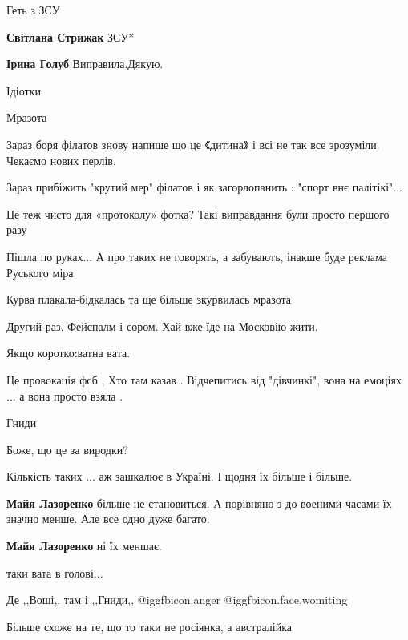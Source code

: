 \begin{itemize}
Геть з ЗСУ

\begin{itemize} %
\textbf{Світлана Стрижак} ЗСУ*

\textbf{Ірина Голуб} Виправила.Дякую.
\end{itemize} %

Ідіотки

Мразота

Зараз боря філатов знову напише що це 《дитина》 і всі не так все зрозуміли. Чекаємо нових перлів.

Зараз прибіжить "крутий мер" філатов і як загорлопанить : "спорт внє палітікі"...

Це теж чисто для «протоколу» фотка? Такі виправдання були просто першого разу

Пішла по руках... А про таких не говорять, а забувають, інакше буде реклама Руського міра

Курва плакала-бідкалась та ще більше зкурвилась мразота

Другий раз. Фейспалм і сором. Хай вже їде на Московію жити.

Якщо коротко:ватна вата.

Це провокація фсб , Хто там казав . Відчепитись від "дівчинкі", вона на емоціях ... а вона просто взяла .

Гниди

Боже, що це за виродки?

Кількість таких ... аж зашкалює в Україні. І щодня їх більше і більше.

\begin{itemize} %
\textbf{Майя Лазоренко} більше не становиться. А порівняно з до военими часами їх значно менше. Але все одно дуже багато.

\textbf{Майя Лазоренко} ні їх меншає.
\end{itemize} %

таки вата в голові...

Де ,,Воші,, там і ,,Гниди,,  @igg{fbicon.anger}  @igg{fbicon.face.womiting} 

Більше схоже на те, що то таки не росіянка, а австралійка\par


\end{itemize}
